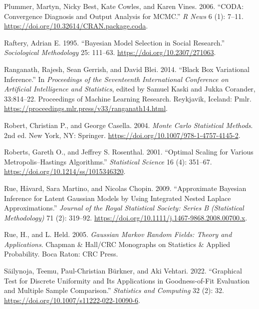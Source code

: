 \documentclass[
  11pt,
  letterpaper,
]{scrbook}
\newlength{\cslhangindent}
\newenvironment{CSLReferences}[2] %
 {\begin{list}{}{%
  \setlength{\itemindent}{0pt}
  \setlength{\leftmargin}{0pt}
  \setlength{\parsep}{0pt}
  \ifodd #1
   \setlength{\leftmargin}{\cslhangindent}
   \setlength{\itemindent}{-1\cslhangindent}
  \fi
  \setlength{\itemsep}{#2\baselineskip}}}
 {\end{list}}
\theoremstyle{plain}
\theoremstyle{plain}
\theoremstyle{plain}
\theoremstyle{definition}
\theoremstyle{definition}
\theoremstyle{definition}
\theoremstyle{remark}
\begin{document}
\begin{CSLReferences}{1}{0}
Plummer, Martyn, Nicky Best, Kate Cowles, and Karen Vines. 2006.
{``{CODA}: Convergence Diagnosis and Output Analysis for {MCMC}.''}
\emph{R News} 6 (1): 7--11.
\url{https://doi.org/10.32614/CRAN.package.coda}.

Raftery, Adrian E. 1995. {``Bayesian Model Selection in Social
Research.''} \emph{Sociological Methodology} 25: 111--63.
\url{https://doi.org/10.2307/271063}.

Ranganath, Rajesh, Sean Gerrish, and David Blei. 2014. {``Black Box
Variational Inference.''} In \emph{Proceedings of the Seventeenth
International Conference on Artificial Intelligence and Statistics},
edited by Samuel Kaski and Jukka Corander, 33:814--22. Proceedings of
Machine Learning Research. Reykjavik, Iceland: Pmlr.
\url{https://proceedings.mlr.press/v33/ranganath14.html}.

Robert, Christian P., and George Casella. 2004. \emph{{M}onte {C}arlo
Statistical Methods}. 2nd ed. New York, NY: Springer.
\url{https://doi.org/10.1007/978-1-4757-4145-2}.

Roberts, Gareth O., and Jeffrey S. Rosenthal. 2001. {``Optimal Scaling
for Various {M}etropolis--{H}astings Algorithms.''} \emph{Statistical
Science} 16 (4): 351--67. \url{https://doi.org/10.1214/ss/1015346320}.

Rue, Håvard, Sara Martino, and Nicolas Chopin. 2009. {``Approximate
Bayesian Inference for Latent {G}aussian Models by Using Integrated
Nested {L}aplace Approximations.''} \emph{Journal of the Royal
Statistical Society: Series B (Statistical Methodology)} 71 (2):
319--92. \url{https://doi.org/10.1111/j.1467-9868.2008.00700.x}.

Rue, H., and L. Held. 2005. \emph{{G}aussian {M}arkov Random Fields:
Theory and Applications}. Chapman \& Hall/CRC Monographs on Statistics
\& Applied Probability. Boca Raton: CRC Press.

Säilynoja, Teemu, Paul-Christian Bürkner, and Aki Vehtari. 2022.
{``Graphical Test for Discrete Uniformity and Its Applications in
Goodness-of-Fit Evaluation and Multiple Sample Comparison.''}
\emph{Statistics and Computing} 32 (2): 32.
\url{https://doi.org/10.1007/s11222-022-10090-6}.


\end{CSLReferences}
\end{document}

